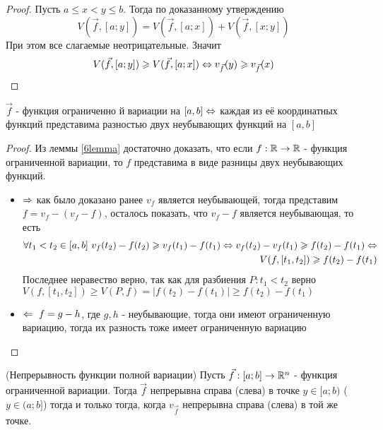 \begin{proof}
	Пусть $a \le x < y \le b$. Тогда по доказанному утверждению
	\[
		V(\vec{f}, [a; y]) = V(\vec{f}, [a; x]) + V(\vec{f}, [x; y])
	\]
	При этом все слагаемые неотрицательные. Значит
	\[
		V(\vec{f}, [a; y]) \geqslant V(\vec{f}, [a; x]) \Leftrightarrow v_{\vec{f}}(y) \geqslant v_{\vec{f}}(x)
	\]
\end{proof}

\begin{corollary}
	$\vec{f}$ - функция ограниченно й вариации на $[a, b] \Leftrightarrow$ каждая из её координатных функций представима разностью двух неубывающих функций на $[a, b]$ 
\end{corollary}

\begin{proof}
	Из леммы \ref{6lemma} достаточно доказать, что если $f: \mathbb{R} \to \mathbb{R}$ - функция ограниченной вариации, то $f$ представима в виде разницы двух неубывающих функций.
	\begin{itemize}
		\item $\Rightarrow$ как было доказано ранее $v_f$ является неубывающей, тогда представим $f = v_f - (v_f - f)$, осталось показать, что $v_f - f$ является неубывающая, то есть
		\begin{align*}
			\forall t_1 < t_2 \in [a, b]\ v_f(t_2) - f(t_2) \geqslant v_f(t_1) - f(t_1) \Leftrightarrow v_f(t_2) - v_f(t_1) \geqslant f(t_2) - f(t_1) \Leftrightarrow \\ V(f, [t_1, t_2]) \geqslant f(t_2) - f(t_1)
		\end{align*}
		Последнее неравество верно, так как для разбиения $P: t_1 < t_2$ верно $V(f, [t_1, t_2]) \ge V(P, f) = |f(t_2) - f(t_1)| \ge f(t_2) - f(t_1)$
		\item $\Leftarrow\ f = g - h$, где $g, h$ - неубывающие, тогда они имеют ограниченную вариацию, тогда их разность тоже имеет ограниченную вариацию
	\end{itemize}
\end{proof}

\begin{theorem} (Непрерывность функции полной вариации)
	Пусть $\vec{f}: [a; b] \to \mathbb{R}^n$ - функция ограниченной вариации. Тогда $\vec{f}$ непрерывна справа (слева) в точке $y \in [a; b)$ ($y \in (a; b]$) тогда и только тогда, когда $v_{\vec{f}}$ непрерывна справа (слева) в той же точке.
\end{theorem}

